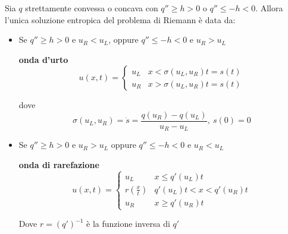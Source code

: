 \documentclass[10pt,a4paper,twoside,openright]{book}
\begin{document}
\begin{theorem}
	Sia $\displaystyle q$ strettamente convessa o concava con $\displaystyle q''\geqslant h >0$ o $\displaystyle q''\leqslant -h< 0$. Allora l'unica soluzione entropica del problema di Riemann è data da:
	\begin{itemize}
		\item Se $\displaystyle q''\geqslant h >0$ e $\displaystyle u_{R} < u_{L}$, oppure $\displaystyle q''\leqslant -h< 0$ e $\displaystyle u_{R}  >u_{L}$
		      
		      \textbf{onda d'urto}
		      \begin{equation*}
		      	u( x,t) =
		      	\begin{cases}
		      		u_{L} & x< \sigma ( u_{L} ,u_{R}) t=s( t) \\
		      		u_{R} & x >\sigma ( u_{L} ,u_{R}) t=s( t) 
		      	\end{cases}
		      \end{equation*}
		      
		      dove 
		      \begin{equation*}
		      	\sigma ( u_{L} ,u_{R}) =\dot{s} =\frac{q( u_{R}) -q( u_{L})}{u_{R} -u_{L}} ,\ s( 0) =0
		      \end{equation*}
		      
		      
		\item Se $\displaystyle q''\geqslant h >0$ e $\displaystyle u_{R}  >u_{L}$ oppure $\displaystyle q''\leqslant -h< 0$ e $\displaystyle u_{R} < u_{L}$
		      
		      \textbf{onda di rarefazione}
		      \begin{equation*}
		      	u( x,t) =
		      	\begin{cases}
		      		u_{L}                     & x\leqslant q'( u_{L}) t       \\
		      		r\left(\frac{x}{t}\right) & q'( u_{L}) t< x< q'( u_{R}) t \\
		      		u_{R}                     & x\geqslant q'( u_{R}) t       
		      	\end{cases}
		      \end{equation*}
		      
		      Dove $\displaystyle r=( q')^{-1}$ è la funzione inversa di $\displaystyle q'$
	\end{itemize}
\end{theorem}
\end{document}
